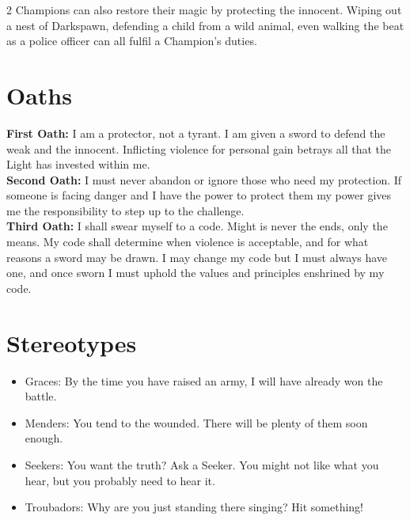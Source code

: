 \begin{multicols}{2}
Champions can also restore their magic by protecting the innocent. Wiping out a nest of Darkspawn, defending a child from a wild animal, even walking the beat as a police officer can all fulfil a Champion's duties. 

\section*{Oaths}
\noindent \textbf{First Oath:} I am a protector, not a tyrant. I am given a sword to defend the weak and the innocent. Inflicting violence for personal gain betrays all that the Light has invested within me. \\

\noindent \textbf{Second Oath:} I must never abandon or ignore those who need my protection. If someone is facing danger and I have the power to protect them my power gives me the responsibility to step up to the challenge.\\

\noindent \textbf{Third Oath:} I shall swear myself to a code. Might is never the ends, only the means. My code shall determine when violence is acceptable, and for what reasons a sword may be drawn. I may change my code but I must always have one, and once sworn I must uphold the values and principles enshrined by my code. 

\section*{Stereotypes}
\begin{itemize}
\item Graces: By the time you have raised an army, I will have already won the battle. 
\item Menders: You tend to the wounded. There will be plenty of them soon enough.
\item Seekers: You want the truth? Ask a Seeker. You might not like what you hear, but you probably need to hear it. 
\item Troubadors: Why are you just standing there singing? Hit something! 


\end{itemize}
\end{multicols}
